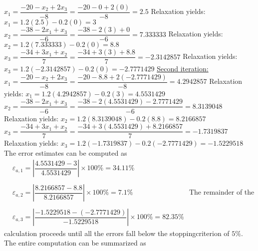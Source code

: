 \documentclass[../main.tex]{subfiles}
\begin{document}
\begin{enumerate}[label=\bfseries(\alph*)]
$x_{1}=\dfrac{-20-x_{2}+2 x_{3}}{-8}=\dfrac{-20-0+2(0)}{-8}=2.5$
\bigbreak
Relaxation yields: $x_{1}=1.2(2.5)-0.2(0)=3$
\bigbreak
$x_{2}=\dfrac{-38-2 x_{1}+x_{3}}{-6}=\dfrac{-38-2(3)+0}{-6}=7.333333$
\bigbreak
Relaxation yields: $x_{2}=1.2(7.333333)-0.2(0)=8.8$
\bigbreak
$x_{3}=\dfrac{-34+3 x_{1}+x_{2}}{7}=\dfrac{-34+3(3)+8.8}{7}=-2.3142857$
\bigbreak
Relaxation yields: $x_{3}=1.2(-2.3142857)-0.2(0)=-2.7771429$ 
\bigbreak
\underline{ Second iteration:}
\bigbreak
$x_{1}=\dfrac{-20-x_{2}+2 x_{3}}{-8}=\dfrac{-20-8.8+2(-2.7771429)}{-8}=4.2942857$
\bigbreak
Relaxation yields: $x_{1}=1.2(4.2942857)-0.2(3)=4.5531429$
\bigbreak
$x_{2}=\dfrac{-38-2 x_{1}+x_{3}}{-6}=\dfrac{-38-2(4.5531429)-2.7771429}{-6}=8.3139048$
\bigbreak
Relaxation yields: $x_{2}=1.2(8.3139048)-0.2(8.8)=8.2166857$
\bigbreak
$x_{3}=\dfrac{-34+3 x_{1}+x_{2}}{7}=\dfrac{-34+3(4.5531429)+8.2166857}{7}=-1.7319837$
\bigbreak
Relaxation yields: $x_{3}=1.2(-1.7319837)-0.2(-2.7771429)=-1.5229518$
\bigbreak
The error estimates can be computed as
\bigbreak$
\begin{aligned}
&\varepsilon_{a, 1}=\left|\dfrac{4.5531429-3}{4.5531429}\right| \times 100 \%=34.11 \% \\\\
&\varepsilon_{a, 2}=\left|\dfrac{8.2166857-8.8}{8.2166857}\right| \times 100 \%=7.1 \% \\\\
&\varepsilon_{a, 3}=\left|\dfrac{-1.5229518-(-2.7771429)}{-1.5229518}\right| \times 100 \%=82.35 \%
\end{aligned}$
\bigbreak
The remainder of the calculation proceeds until all the errors fall below the stopping\smallbreak criterion of $5 \%$. The entire computation can be summarized as
\bigbreak


\end{enumerate}
\end{document}
